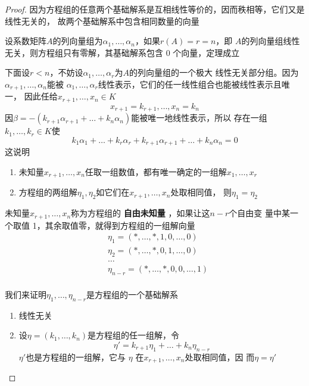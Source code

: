 \documentclass[11pt]{article}
\begin{document}
\begin{proof}
因为方程组的任意两个基础解系是互相线性等价的，因而秩相等，它们又是线性无关的，
故两个基础解系中包含相同数量的向量

设系数矩阵\(A\)的列向量组为\(\alpha_1,\dots,\alpha_n\)，如果\(r(A)=r=n\)，即
\(A\)的列向量组线性无关，则方程组只有零解，其基础解系包含 0 个向量，定理成立

下面设\(r<n\)，不妨设\(\alpha_1,\dots,\alpha_r\)为\(A\)的列向量组的一个极大
线性无关部分组。因为\(\alpha_{r+1},\dots,\alpha_n\)能被
\(\alpha_1,\dots,\alpha_r\)线性表示，它们的任一线性组合也能被线性表示且唯一，
因此任给\(x_{r+1},\dots,x_n\in K\)
\begin{equation*}
x_{r+1}=k_{r+1},\dots,x_n=k_n
\end{equation*}
因\(\beta=-(k_{r+1}\alpha_{r+1}+\dots+k_n\alpha_n)\)能被唯一地线性表示，所以
存在一组\(k_1,\dots,k_r\in K\)使
\begin{equation*}
k_1\alpha_1+\dots+k_r\alpha_r+k_{r+1}\alpha_{r+1}+\dots+k_n\alpha_n=0
\end{equation*}
这说明
\begin{enumerate}
\item 未知量\(x_{r+1},\dots,x_n\)任取一组数值，都有唯一确定的一组解\(x_1,\dots,x_r\)
\item 方程组的两组解\(\eta_1,\eta_2\)如它们在\(x_{r+1},\dots,x_n\)处取相同值，
则\(\eta_1=\eta_2\)
\end{enumerate}


未知量\(x_{r+1},\dots,x_n\)称为方程组的 \textbf{自由未知量} ，如果让这\(n-r\)个自由变
量中某一个取值 1，其余取值零，就得到方程组的一组解向量
\begin{align*}
&\eta_1=(*,\dots,*,1,0,\dots,0)\\
&\eta_2=(*,\dots,*,0,1,\dots,0)\\
&\dots\\
&\eta_{n-r}=(*,\dots,*,0,0,\dots,1)\\
\end{align*}

我们来证明\(\eta_1,\dots,\eta_{n-r}\)是方程组的一个基础解系
\begin{enumerate}
\item 线性无关
\item 设\(\eta=(k_1,\dots,k_n)\)是方程组的任一组解，令
\begin{equation*}
\eta'=k_{r+1}\eta_1+\dots+k_n\eta_{n-r}
\end{equation*}
\(\eta'\)也是方程组的一组解，它与 \(\eta\) 在\(x_{r+1},\dots,x_n\)处取相同值，因
而\(\eta=\eta'\)
\end{enumerate}
\end{proof}
\end{document}
